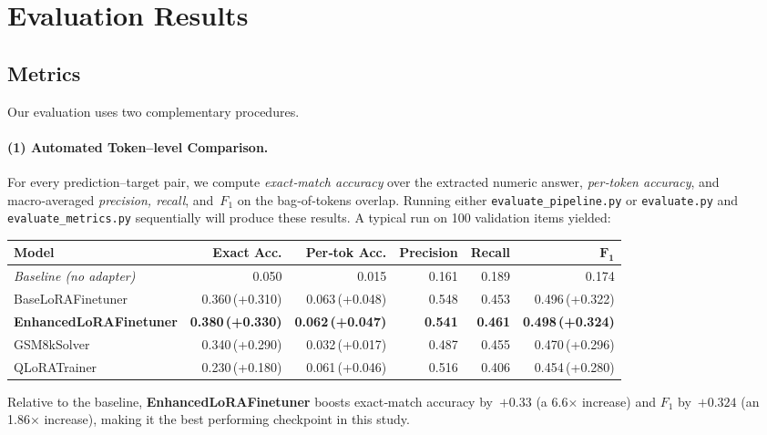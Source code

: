 \documentclass[11pt]{article}
\begin{document}
\section{Evaluation Results}
\subsection{Metrics}
Our evaluation uses two complementary procedures.

\paragraph{(1) Automated Token--level Comparison.}
For every prediction--target pair, we compute \emph{exact‑match accuracy} over the extracted numeric answer, \emph{per‑token accuracy}, and macro‑averaged \emph{precision, recall}, and~\(F_{1}\) on the bag‑of‑tokens overlap. Running either \verb|evaluate_pipeline.py| or \verb|evaluate.py| and \verb|evaluate_metrics.py| sequentially will produce these results. A typical run on 100 validation items yielded:

\begin{center}
\small
\begin{tabular}{@{}lrrrrr@{}}
\toprule
\textbf{Model} & \textbf{Exact Acc.} & \textbf{Per‑tok Acc.} & \textbf{Precision} & \textbf{Recall} & \(\mathbf{F_{1}}\) \\
\midrule
\textit{Baseline (no adapter)}   & 0.050 & 0.015 & 0.161 & 0.189 & 0.174 \\
BaseLoRAFinetuner               & 0.360\,(+0.310) & 0.063\,(+0.048) & 0.548 & 0.453 & 0.496\,(+0.322) \\
\textbf{EnhancedLoRAFinetuner}  & \textbf{0.380\,(+0.330)} & \textbf{0.062\,(+0.047)} & \textbf{0.541} & \textbf{0.461} & \textbf{0.498\,(+0.324)} \\
GSM8kSolver                     & 0.340\,(+0.290) & 0.032\,(+0.017) & 0.487 & 0.455 & 0.470\,(+0.296) \\
QLoRATrainer                    & 0.230\,(+0.180) & 0.061\,(+0.046) & 0.516 & 0.406 & 0.454\,(+0.280) \\
\bottomrule
\end{tabular}
\end{center}

\noindent
Relative to the baseline, \textbf{EnhancedLoRAFinetuner} boosts exact‑match accuracy by \(+0.33\) (a 6.6× increase) and \(F_{1}\) by \(+0.324\) (an 1.86× increase), making it the best performing checkpoint in this study.
\end{document}

